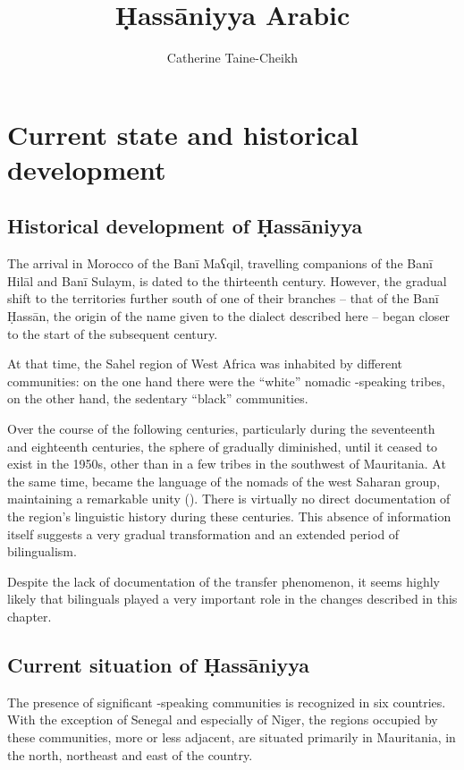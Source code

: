 \documentclass[output=paper]{langsci/langscibook}
\author{Catherine Taine-Cheikh\affiliation{CNRS, LACITO}}
\title{Ḥassāniyya Arabic}
\begin{document}
\maketitle 
 

\section{Current state and historical development}

\subsection{Historical development of Ḥassāniyya} %

The arrival in Morocco of the Banī Maʕqil, travelling companions of the Banī Hilāl and Banī Sulaym, is dated to the thirteenth century. However, the gradual shift to the territories further south of one of their branches – that of the Banī Ḥassān, the origin of the name given to the dialect described here – began closer to the start of the subsequent century. 

At that time, the Sahel region of West Africa was inhabited by different communities: on the one hand there were the “white” nomadic -speaking tribes, on the other hand, the sedentary “black” communities.

Over the course of the following centuries, particularly during the seventeenth and eighteenth centuries, the sphere of   gradually diminished, until it ceased to exist in the 1950s, other than in a few tribes in the southwest of Mauritania. At the same time,   became the language of the nomads of the west Saharan group, maintaining a remarkable unity (\citealt{Taine-Cheikh2016,Taine-Cheikh2018historical}). There is virtually no direct documentation of the region’s linguistic history during these centuries. This absence of information itself suggests a very gradual transformation and an extended period of {bilingualism}.

Despite the lack of documentation of the {transfer} phenomenon, it seems highly likely that bilinguals played a very important role in the changes described in this chapter. 

\subsection{Current situation of Ḥassāniyya} %

The presence of significant -speaking communities is recognized in six countries. With the exception of Senegal and especially of Niger, the regions occupied by these communities, more or less adjacent, are situated primarily in Mauritania, in the north, northeast and east of the country. 
\end{document}
